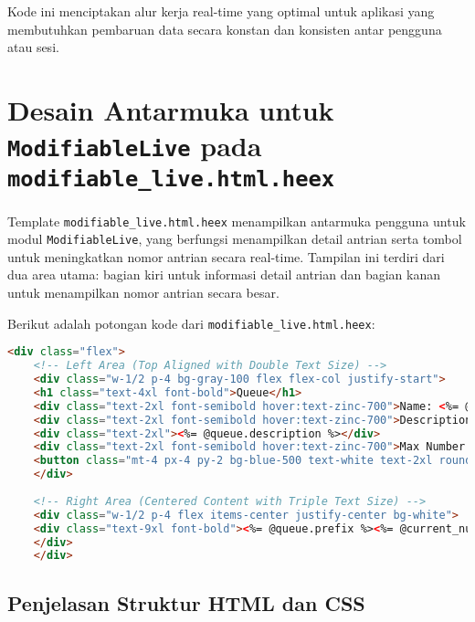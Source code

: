 Kode ini menciptakan alur kerja real-time yang optimal untuk aplikasi yang membutuhkan pembaruan data secara konstan dan konsisten antar pengguna atau sesi.


\section{Desain Antarmuka untuk \texttt{ModifiableLive} pada \texttt{modifiable\_live.html.heex}}

Template \texttt{modifiable\_live.html.heex} menampilkan antarmuka pengguna untuk modul \texttt{ModifiableLive}, yang berfungsi menampilkan detail antrian serta tombol untuk meningkatkan nomor antrian secara real-time. Tampilan ini terdiri dari dua area utama: bagian kiri untuk informasi detail antrian dan bagian kanan untuk menampilkan nomor antrian secara besar.

Berikut adalah potongan kode dari \texttt{modifiable\_live.html.heex}:

\begin{lstlisting}[language=HTML]
	<div class="flex">
	<!-- Left Area (Top Aligned with Double Text Size) -->
	<div class="w-1/2 p-4 bg-gray-100 flex flex-col justify-start">
	<h1 class="text-4xl font-bold">Queue</h1>
	<div class="text-2xl font-semibold hover:text-zinc-700">Name: <%= @queue.name %></div>
	<div class="text-2xl font-semibold hover:text-zinc-700">Description:</div>
	<div class="text-2xl"><%= @queue.description %></div>
	<div class="text-2xl font-semibold hover:text-zinc-700">Max Number: <%= @queue.max_number %></div>
	<button class="mt-4 px-4 py-2 bg-blue-500 text-white text-2xl rounded hover:bg-blue-600" phx-click="increment_number">Next Number</button>
	</div>
	
	<!-- Right Area (Centered Content with Triple Text Size) -->
	<div class="w-1/2 p-4 flex items-center justify-center bg-white">
	<div class="text-9xl font-bold"><%= @queue.prefix %><%= @current_number %></div>
	</div>
	</div>
\end{lstlisting}

\subsection{Penjelasan Struktur HTML dan CSS}


